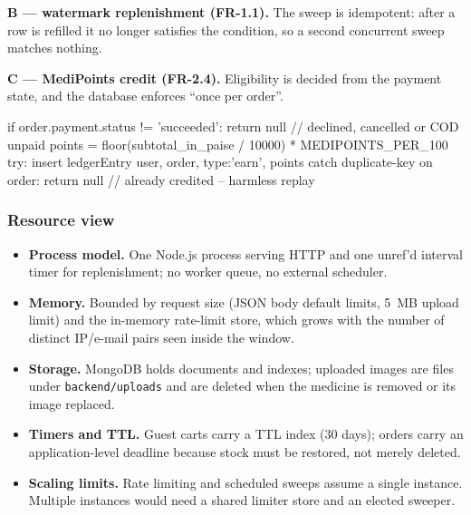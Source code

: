 \documentclass[11pt,a4paper]{article}
\begin{document}
\noindent\textbf{B --- watermark replenishment (FR-1.1).} The sweep is idempotent:
after a row is refilled it no longer satisfies the condition, so a second concurrent
sweep matches nothing.

\noindent\textbf{C --- MediPoints credit (FR-2.4).} Eligibility is decided from the
payment state, and the database enforces ``once per order''.
\begin{codeblock}
if order.payment.status != 'succeeded': return null    // declined, cancelled or COD unpaid
points = floor(subtotal_in_paise / 10000) * MEDIPOINTS_PER_100
try: insert ledgerEntry { user, order, type:'earn', points }
catch duplicate-key on order: return null              // already credited -- harmless replay
\end{codeblock}

\subsubsection{Resource view}
\begin{itemize}[leftmargin=1.2em,itemsep=1pt,topsep=2pt]
  \item \textbf{Process model.} One Node.js process serving HTTP and one unref'd interval timer for replenishment; no worker queue, no external scheduler.
  \item \textbf{Memory.} Bounded by request size (JSON body default limits, 5~MB upload limit) and the in-memory rate-limit store, which grows with the number of distinct IP/e-mail pairs seen inside the window.
  \item \textbf{Storage.} MongoDB holds documents and indexes; uploaded images are files under \texttt{backend/uploads} and are deleted when the medicine is removed or its image replaced.
  \item \textbf{Timers and TTL.} Guest carts carry a TTL index (30 days); orders carry an application-level deadline because stock must be restored, not merely deleted.
  \item \textbf{Scaling limits.} Rate limiting and scheduled sweeps assume a single instance. Multiple instances would need a shared limiter store and an elected sweeper.
\end{itemize}
\end{document}
